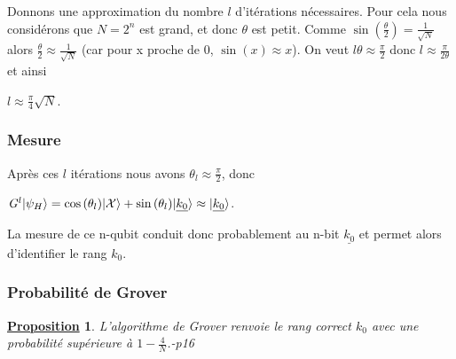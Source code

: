 \documentclass[12pt,openany]{report}
\newtheorem{proposition}{\underline{Proposition}}
\DeclarePairedDelimiter\ket{\lvert}{\rangle}
\begin{document}
Donnons une approximation du nombre $l$ d'itérations nécessaires. Pour cela nous considérons que $N=2^n $ est grand, et donc $\theta $ est petit. Comme $\sin{(\frac{\theta}{2})}=\frac{1}{\sqrt{N}}  $ alors $\frac{\theta}{2} \approx \frac{1}{\sqrt{N}}$ (car pour x proche de 0, $\sin{(x)}\approx x $). On veut $ l \theta \approx \frac{\pi}{2}  $
 donc $ l \approx \frac{\pi}{2 \theta} $
et ainsi 
\begin{center}
$ l \approx \frac{\pi}{4}\sqrt{N} $.
\end{center}

\subsubsection{Mesure}

Après ces $l$ itérations nous avons $\theta_l \approx \frac{\pi}{2} $, donc 
\begin{center}
$\mathit{G}^{l}\ket{\psi_H}=\cos{(\theta_l)}\ket{\mathcal{X}}+ \sin{(\theta_l)}\ket{\underline{k_0}}\approx \ket{\underline{k_0}} $.
\end{center}
La mesure de ce n-qubit conduit donc probablement au n-bit $\underline{k_0} $
et permet alors d'identifier le rang $k_0 $. 
\subsubsection{Probabilité de Grover}
\begin{proposition}
L'algorithme de Grover renvoie le rang correct $k_0 $ avec une probabilité supérieure à $1-\frac{4}{N} $.\cite{Arnaud}-p16
\end{proposition}
\end{document}
